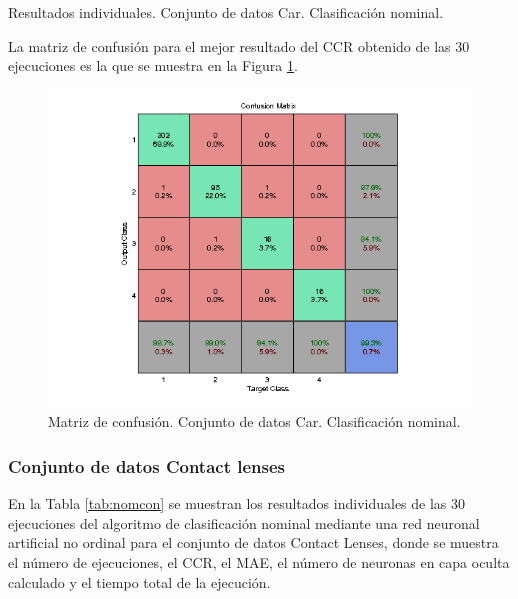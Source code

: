 			\begin{table}[!htbp]
				\centering
				\caption{Resultados individuales. Conjunto de datos Car. Clasificación nominal.}
				\label{tab:nomcar}
			\end{table}
			
			La matriz de confusión para el mejor resultado del CCR obtenido de las 30 ejecuciones es la que se muestra en la Figura \ref{fig:nomcar}.
			
			\begin{figure}[htbp]
				\centering
				\includegraphics[scale=0.8]{../src/results/nominal/car_mc22.png}
				\caption{Matriz de confusión. Conjunto de datos Car. Clasificación nominal.}
				\label{fig:nomcar}
			\end{figure}

			\subsubsection{Conjunto de datos Contact lenses}
			
			En la Tabla \ref{tab:nomcon} se muestran los resultados individuales de las 30 ejecuciones del algoritmo de clasificación nominal mediante una red neuronal artificial no ordinal para el conjunto de datos Contact Lenses, donde se muestra el número de ejecuciones, el CCR, el MAE, el número de neuronas en capa oculta calculado y el tiempo total de la ejecución.\\
			
